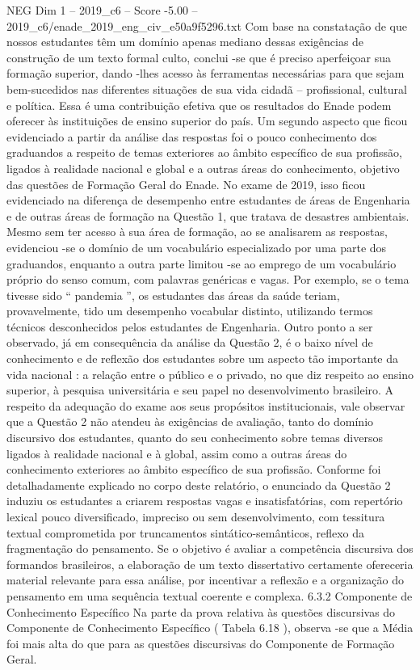 \begin{textsample}{NEG Dim 1 – 2019\_c6 – Score -5.00 – 2019\_c6/enade\_2019\_eng\_civ\_e50a9f5296.txt}
Com base na constatação de que nossos estudantes têm um domínio apenas mediano dessas exigências de construção de um texto formal culto, conclui -se que é preciso aperfeiçoar sua formação superior, dando -lhes acesso às ferramentas necessárias para que sejam bem-sucedidos nas diferentes situações de sua vida cidadã – profissional, cultural e política.
Essa é uma contribuição efetiva que os resultados do Enade podem oferecer às instituições de ensino superior do país.
Um segundo aspecto que ficou evidenciado a partir da análise das respostas foi o pouco conhecimento dos graduandos a respeito de temas exteriores ao âmbito específico de sua profissão, ligados à realidade nacional e global e a outras áreas do conhecimento, objetivo das questões de Formação Geral do Enade.
No exame de 2019, isso ficou evidenciado na diferença de desempenho entre estudantes de áreas de Engenharia e de outras áreas de formação na Questão 1, que tratava de desastres ambientais.
Mesmo sem ter acesso à sua área de formação, ao se analisarem as respostas, evidenciou -se o domínio de um vocabulário especializado por uma parte dos graduandos, enquanto a outra parte limitou -se ao emprego de um vocabulário próprio do senso comum, com palavras genéricas e vagas.
Por exemplo, se o tema tivesse sido “ pandemia ”, os estudantes das áreas da saúde teriam, provavelmente, tido um desempenho vocabular distinto, utilizando termos técnicos desconhecidos pelos estudantes de Engenharia.
Outro ponto a ser observado, já em consequência da análise da Questão 2, é o baixo nível de conhecimento e de reflexão dos estudantes sobre um aspecto tão importante da vida nacional : a relação entre o público e o privado, no que diz respeito ao ensino superior, à pesquisa universitária e seu papel no desenvolvimento brasileiro.
A respeito da adequação do exame aos seus propósitos institucionais, vale observar que a Questão 2 não atendeu às exigências de avaliação, tanto do domínio discursivo dos estudantes, quanto do seu conhecimento sobre temas diversos ligados à realidade nacional e à global, assim como a outras áreas do conhecimento exteriores ao âmbito específico de sua profissão.
Conforme foi detalhadamente explicado no corpo deste relatório, o enunciado da Questão 2 induziu os estudantes a criarem respostas vagas e insatisfatórias, com repertório lexical pouco diversificado, impreciso ou sem desenvolvimento, com tessitura textual comprometida por truncamentos sintático-semânticos, reflexo da fragmentação do pensamento.
Se o objetivo é avaliar a competência discursiva dos formandos brasileiros, a elaboração de um texto dissertativo certamente ofereceria material relevante para essa análise, por incentivar a reflexão e a organização do pensamento em uma sequência textual coerente e complexa. 6.3.2 Componente de Conhecimento Específico Na parte da prova relativa às questões discursivas do Componente de Conhecimento Específico ( Tabela 6.18 ), observa -se que a Média foi mais alta do que para as questões discursivas do Componente de Formação Geral.

\end{textsample}
